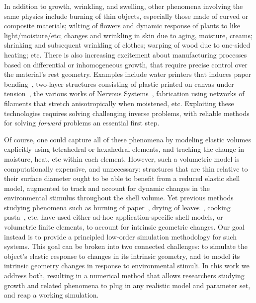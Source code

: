\documentclass[timestamp,acmtog]{acmart}
\begin{document}
In addition to growth, wrinkling, and swelling, other phenomena involving the same physics include burning of thin objects, especially those made of curved or composite materials; wilting of flowers and dynamic response of plants to like light/moisture/etc; changes and wrinkling in skin due to aging, moisture, creams; shrinking and subsequent wrinkling of clothes; warping of wood due to one-sided heating; etc. There is also increasing excitement about manufacturing processes based on differential or inhomogeneous growth, that require precise control over the material's rest geometry. Examples include water printers that induces paper bending~\cite{Guberan2012}, two-layer structures consisting of plastic printed on canvas under tension~\cite{Perez2017}, the various works of Nervous Systems~\cite{NervousSystems}, fabrication using networks of filaments that stretch anisotropically when moistened, etc. Exploiting these technologies requires solving challenging inverse problems, with reliable methods for solving \emph{forward} problems an essential first step. 

Of course, one could capture all of these phenomena by modeling elastic volumes explicitly using tetrahedral or hexahedral elements, and tracking the change in moisture, heat, etc within each element. However, such a volumetric model is computationally expensive, and unnecessary: structures that are thin relative to their surface diameter ought to be able to benefit from a reduced elastic shell model, augmented to track and account for dynamic changes in the environmental stimulus throughout the shell volume. Yet previous methods studying phenomena such as burning of paper~\cite{Liu2009}, drying of leaves~\cite{Jeong2013}, cooking pasta~\cite{Wang2017}, etc, have used either ad-hoc application-specific shell models, or volumetric finite elements, to account for intrinsic geometric changes. Our goal instead is to provide a principled low-order simulation methodology for such systems. This goal can be broken into two connected challenges: to simulate the object's elastic response to changes in its intrinsic geometry, and to model its intrinsic geometry changes in response to environmental stimuli. In this work we address both, resulting in a numerical method that allows researchers studying growth and related phenomena to plug in any realistic model and parameter set, and reap a working simulation.
\end{document}
